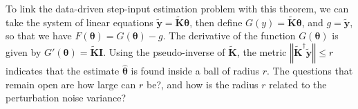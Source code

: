 \documentclass[11pt]{article}
\begin{document}
    To link the data-driven step-input estimation problem with this theorem, we can take the system of linear equations $\widetilde{\mathbf{y}} = \widetilde{\mathbf{K}} \bm{\theta}$, then define $G(y) = \widetilde{\mathbf{K}} \bm{\theta}$, and $g = \widetilde{\mathbf{y}}$, so that we have $F(\bm{\theta}) = G(\bm{\theta}) - g$. The derivative of the function $G(\bm{\theta})$ is given by $G'(\bm{\theta}) = \widetilde{\mathbf{K}} \mathbf{I}$. Using the pseudo-inverse of $\widetilde{\mathbf{K}}$, the metric $\left\Vert  \widetilde{\mathbf{K}}^{\dagger} \widetilde{\mathbf{y}} \right\Vert \leq r$ indicates that the estimate $\hat{\bm{\theta}}$ is found inside a ball of radius $r$.
    The questions that remain open are how large can $r$ be?, and how is the radius $r$ related to the perturbation noise variance? 
\color{black}
	


\end{document}
